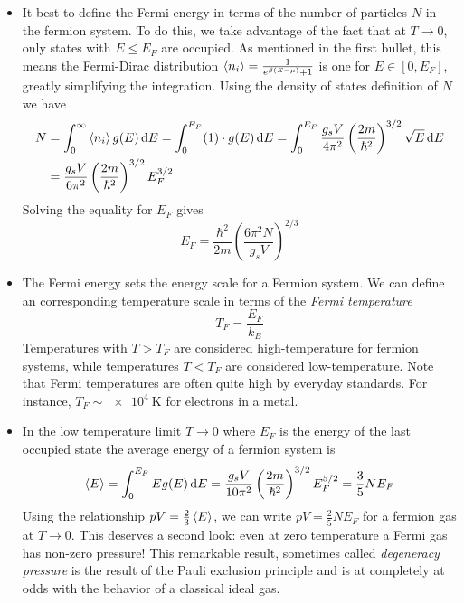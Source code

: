 \documentclass[11pt, a4paper]{article}
\newcommand{\diff}{\mathop{}\!\mathrm{d}} %
\begin{document}
\begin{itemize}
	\item It best to define the Fermi energy in terms of the number of particles $ N $ in the fermion system. To do this, we take advantage of the fact that at $ T \to 0 $, only states with $ E \leq E_{F} $ are occupied. As mentioned in the first bullet, this means the Fermi-Dirac distribution $ \expval{n_{i}} = \frac{1}{e^{\beta(E - \mu)}+1}$ is one for $ E \in [0, E_{F}] $, greatly simplifying the integration. Using the density of states definition of $ N $ we have
	\begin{align*}
		N &= \int_{0}^{\infty}\expval{n_{i}}g(E) \diff E = \int_{0}^{E_{F}} (1) \cdot g(E) \diff E = \int_{0}^{E_{F}} \frac{g_{s}V}{4\pi^{2}} \left(\frac{2m}{\hbar^{2}}\right)^{3/2} \sqrt{E} \diff E \\
		&= \frac{g_{s}V}{6\pi^{2}} \left(\frac{2m}{\hbar^{2}}\right)^{3/2} E_{F}^{3/2}
	\end{align*}
	Solving the equality for $ E_{F} $ gives
	\begin{equation*}
		E_{F} = \frac{\hbar^{2}}{2m} \left(\frac{6\pi^{2}N}{g_{s}V}\right)^{2/3}
	\end{equation*}
	
	\item The Fermi energy sets the energy scale for a Fermion system. We can define an corresponding temperature scale in terms of the \textit{Fermi temperature}
	\begin{equation*}
		T_{F} = \frac{E_{F}}{k_{B}}
	\end{equation*}
	Temperatures with $ T > T_{F} $ are considered high-temperature for fermion systems, while temperatures $ T < T_{F} $ are considered low-temperature. Note that Fermi temperatures are often quite high by everyday standards. For instance, $ T_{F} \sim \SI{e4}{\kelvin} $ for electrons in a metal.
	
	\item In the low temperature limit $ T \to 0 $ where $ E_{F} $ is the energy of the last occupied state the average energy of a fermion system is
	\begin{equation*}
		\expval{E} = \int_{0}^{E_{F}} E g(E) \diff E =  \frac{g_{s}V}{10\pi^{2}} \left(\frac{2m}{\hbar^{2}}\right)^{3/2} E_{F}^{5/2} = \frac{3}{5}NE_{F}
	\end{equation*}
	Using the relationship $ pV = \frac{2}{3}\expval{E} $, we can  write $ pV  = \frac{2}{5} N E_{F} $ for a fermion gas at $ T \to 0 $. This deserves a second look: even at zero temperature a Fermi gas has non-zero pressure! This remarkable result, sometimes called \textit{degeneracy pressure} is the result of the Pauli exclusion principle and is at completely at odds with the behavior of a classical ideal gas.
	
\end{itemize}
\end{document}
